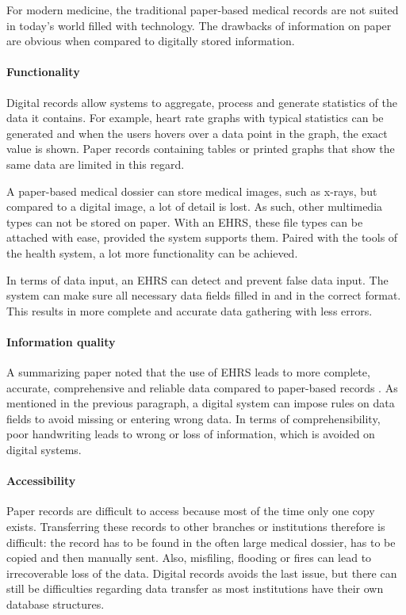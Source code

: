         For modern medicine, the traditional paper-based medical records are not suited in today's world filled with technology. The drawbacks of information on paper are obvious when compared to digitally stored information.

        \paragraph{Functionality} Digital records allow systems to aggregate, process and generate statistics of the data it contains. For example, heart rate graphs with typical statistics can be generated and when the users hovers over a data point in the graph, the exact value is shown. Paper records containing tables or printed graphs that show the same data are limited in this regard.

        A paper-based medical dossier can store medical images, such as x-rays, but compared to a digital image, a lot of detail is lost. As such, other multimedia types can not be stored on paper. With an EHRS, these file types can be attached with ease, provided the system supports them. Paired with the tools of the health system, a lot more functionality can be achieved.

        In terms of data input, an EHRS can detect and prevent false data input. The system can make sure all necessary data fields filled in and in the correct format. This results in more complete and accurate data gathering with less errors.

        \paragraph{Information quality} A summarizing paper noted that the use of EHRS leads to more complete, accurate, comprehensive and reliable data compared to paper-based records \cite{ehrs_summary}. As mentioned in the previous paragraph, a digital system can impose rules on data fields to avoid missing or entering wrong data. In terms of comprehensibility, poor handwriting leads to wrong or loss of information, which is avoided on digital systems.

        \paragraph{Accessibility} Paper records are difficult to access because most of the time only one copy exists. Transferring these records to other branches or institutions therefore is difficult: the record has to be found in the often large medical dossier, has to be copied and then manually sent. Also, misfiling, flooding or fires can lead to irrecoverable loss of the data. Digital records avoids the last issue, but there can still be difficulties regarding data transfer as most institutions have their own database structures.

